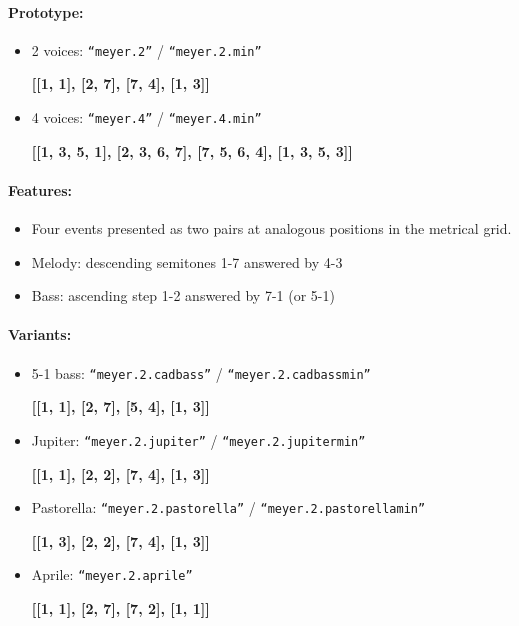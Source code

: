 \documentclass[11pt, openany]{article}
\begin{document}
\paragraph{Prototype:}
\begin{itemize}
\item 2 voices: \texttt{“meyer.2”} / \texttt{“meyer.2.min”}
	\begin{center}
	\textbf{[[1, 1], [2, 7], [7, 4], [1, 3]]}
	\end{center}
\item 4 voices: \texttt{“meyer.4”} / \texttt{“meyer.4.min”}
	\begin{center}
	\textbf{[[1, 3, 5, 1], [2, 3, 6, 7], [7, 5, 6, 4], [1, 3, 5, 3]]}
	\end{center}
\end{itemize}

\paragraph{Features:}
\begin{itemize}
\item Four events presented as two pairs at analogous positions in the metrical grid.
\item Melody: descending semitones 1-7 answered by 4-3
\item Bass: ascending step 1-2 answered by 7-1 (or 5-1)
\end{itemize}

\paragraph{Variants:}
\begin{itemize}
\item 5-1 bass: \texttt{“meyer.2.cadbass”} / \texttt{“meyer.2.cadbassmin”}
	\begin{center}
	\textbf{[[1, 1], [2, 7], [5, 4], [1, 3]]}
	\end{center}
\item Jupiter: \texttt{“meyer.2.jupiter”} / \texttt{“meyer.2.jupitermin”}
	\begin{center}
	\textbf{[[1, 1], [2, 2], [7, 4], [1, 3]]}
	\end{center}
\item Pastorella: \texttt{“meyer.2.pastorella”} / \texttt{“meyer.2.pastorellamin”}
	\begin{center}
	\textbf{[[1, 3], [2, 2], [7, 4], [1, 3]]}
	\end{center}
\item Aprile: \texttt{“meyer.2.aprile”}
	\begin{center}
	\textbf{[[1, 1], [2, 7], [7, 2], [1, 1]]}
	\end{center}
\end{itemize}
\end{document}
